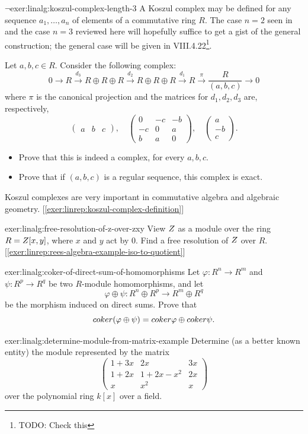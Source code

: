 \begin{exer}{$\lnot$}{exer:linalg:koszul-complex-length-3}
  A Koszul complex may be defined for any sequence $a_1, \dots, a_n$
  of elements of a commutative ring $R$. The case $n = 2$ seen in
   and the case $n = 3$
  reviewed here will hopefully suffice to get a gist of the general
  construction; the general case will be given in VIII.4.22\footnote{TODO: Check this}.

  Let $a, b, c \in R$. Consider the following complex:
  \[
    0 \to R \xrightarrow{d_3} R \oplus R \oplus R \xrightarrow{d_2} R
    \oplus R \oplus R \xrightarrow{d_1} R \xrightarrow{\pi}
    \frac{R}{(a,b,c)} \to 0
  \]
  where $\pi$ is the canonical projection and the matrices for
  $d_1, d_2, d_3$ are, respectively,
  \[
    \begin{pmatrix} a & b & c \end{pmatrix}, \quad
    \begin{pmatrix} 0 & -c & -b \\ -c & 0 & a \\ b & a &
      0 \end{pmatrix}, \quad
    \begin{pmatrix} a \\ -b \\ c \end{pmatrix}.
  \]
  \begin{itemize}
  \item Prove that this is indeed a complex, for every $a, b, c$.
  \item Prove that if $(a,b,c)$ is a regular sequence, this complex is
    exact.
  \end{itemize}
  Koszul complexes are very important in commutative algebra and
  algebraic geometry. [\ref{exer:linrep:koszul-complex-definition}]
\end{exer}
\begin{exer}{\exerused}{exer:linalg:free-resolution-of-z-over-zxy}
  View $Z$ as a module over the ring $R = Z[x,y]$, where $x$ and $y$
  act by $0$. Find a free resolution of $Z$ over
  $R$. [\ref{exer:linrep:rees-algebra-example-iso-to-quotient}]
\end{exer}
\begin{exer}{\exerused}{exer:linalg:coker-of-direct-sum-of-homomorphisms}
  Let $\varphi : R^n \to R^m$ and $\psi : R^p \to R^q$ be two
  $R$-module homomorphisms, and let
  \[
    \varphi \oplus \psi : R^n \oplus R^p \to R^m \oplus R^q
  \]
  be the morphism induced on direct sums. Prove that
  \[
    coker(\varphi \oplus \psi) = coker\varphi \oplus coker\psi.
  \]
\end{exer}
\begin{exer}{}{exer:linalg:determine-module-from-matrix-example}
  Determine (as a better known entity) the module represented by the
  matrix
  \[
    \begin{pmatrix}
      1+3x & 2x & 3x \\
      1+2x & 1+2x-x^2 & 2x \\
      x & x^2 & x
    \end{pmatrix}
  \]
  over the polynomial ring $k[x]$ over a field.
\end{exer}

